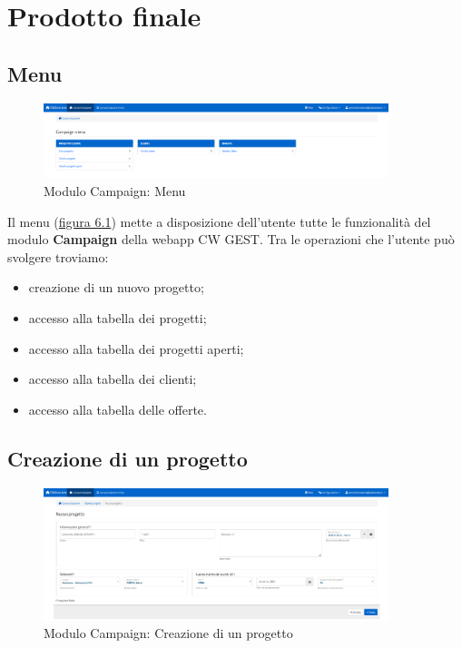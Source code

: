 \chapter{Prodotto finale}
\label{cap:prodotto-finale}


\setlength{\parskip}{3ex}

\section{Menu}
\begin{figure}[!h]
\centering
\includegraphics[width=380px]{../images/UI/01-menu.png}
\caption{Modulo Campaign: Menu}
\label{fig:menu}
\end{figure}

\noindent Il menu ({\hyperref[fig:menu]{figura 6.1}}) mette a disposizione dell'utente tutte le funzionalità del modulo \textbf{Campaign} della webapp CW GEST. Tra le operazioni che l'utente può svolgere troviamo:
\begin{itemize}
\item creazione di un nuovo progetto;
\item accesso alla tabella dei progetti;
\item accesso alla tabella dei progetti aperti;
\item accesso alla tabella dei clienti;
\item accesso alla tabella delle offerte.
\end{itemize}

\pagebreak

\section{Creazione di un progetto}
\begin{figure}[!h]
\centering
\includegraphics[width=380px]{../images/UI/02-nuovoProgetto.png}
\caption{Modulo Campaign: Creazione di un progetto}
\label{fig:nuovoProgetto}
\end{figure}

